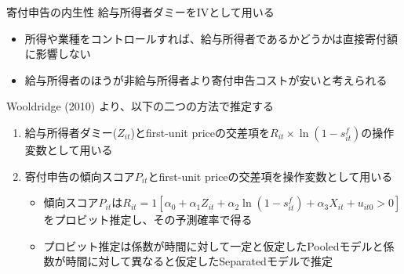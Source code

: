 \documentclass[
  ignorenonframetext,
  aspectratio=169,
]{beamer}
\providecommand{\tightlist}{%
  \setlength{\itemsep}{0pt}\setlength{\parskip}{0pt}}
\begin{document}
\begin{frame}{寄付申告の内生性}
\protect\hypertarget{ux5bc4ux4ed8ux7533ux544aux306eux5185ux751fux6027}{}
給与所得者ダミーをIVとして用いる

\begin{itemize}
\tightlist
\item
  所得や業種をコントロールすれば、給与所得者であるかどうかは直接寄付額に影響しない
\item
  給与所得者のほうが非給与所得者より寄付申告コストが安いと考えられる
\end{itemize}

Wooldridge (2010) より、以下の二つの方法で推定する

\begin{enumerate}
\tightlist
\item
  給与所得者ダミー(\(Z_{it}\))とfirst-unit priceの交差項を\(R_{it} \times \ln (1 - s^f_{it})\)の操作変数として用いる
\item
  寄付申告の傾向スコア\(P_{it}\)とfirst-unit priceの交差項を操作変数として用いる

  \begin{itemize}
  \tightlist
  \item
    傾向スコア\(P_{it}\)は\(R_{it} = 1[\alpha_0 + \alpha_1 Z_{it} + \alpha_2 \ln(1 - s^f_{it}) + \alpha_3 X_{it} + u_{it0} > 0]\)をプロビット推定し、その予測確率で得る
  \item
    プロビット推定は係数が時間に対して一定と仮定したPooledモデルと係数が時間に対して異なると仮定したSeparatedモデルで推定
  \end{itemize}
\end{enumerate}
\end{frame}
\end{document}
